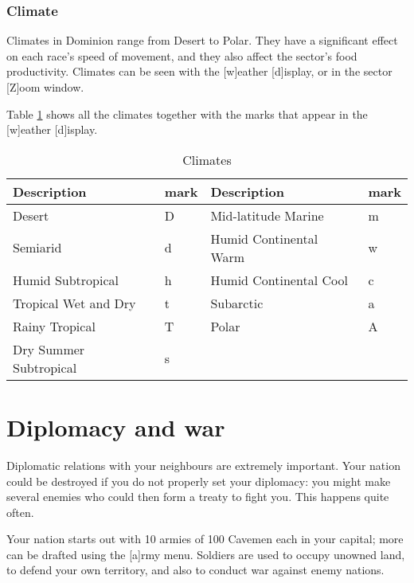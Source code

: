 \subsection{Climate}

Climates in Dominion range from Desert to Polar.  They have a
significant effect on each race's speed of movement, and they also
affect the sector's food productivity.  Climates can be seen with the
[w]eather [d]isplay, or in the sector [Z]oom window.

Table \ref{tab-climates} shows all the climates together with the
marks that appear in the [w]eather [d]isplay.

\begin{same}
\begin{table}[hbpt]
\caption{Climates}
\label{tab-climates}
\begin{tabular}{ || l | l | l | l ||}
\hline
Description            & mark & Description            & mark \\
\hline
Desert                 &  D   & Mid-latitude Marine    &  m \\
Semiarid               &  d   & Humid Continental Warm &  w \\
Humid Subtropical      &  h   & Humid Continental Cool &  c \\
Tropical Wet and Dry   &  t   & Subarctic              &  a \\
Rainy Tropical         &  T   & Polar                  &  A \\
Dry Summer Subtropical &  s   &                        &    \\
\hline
\end{tabular}
\end{table}
\end{same}

\chapter{Diplomacy and war}

Diplomatic relations with your neighbours are extremely important.
Your nation could be destroyed if you do not properly set your
diplomacy: you might make several enemies who could then form a treaty
to fight you.  This happens quite often.

Your nation starts out with 10 armies of 100 Cavemen each in your
capital; more can be drafted using the [a]rmy menu.  Soldiers are used
to occupy unowned land, to defend your own territory, and also to
conduct war against enemy nations.

